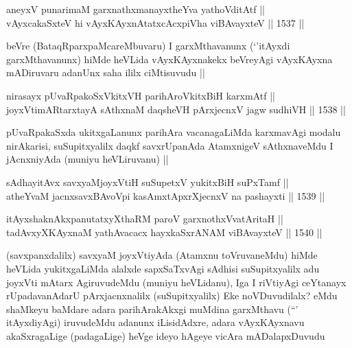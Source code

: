 
\begin{shl}
aneyxV punarimaM garxnathxmanayxtheYva yathoVditAtf ||  \\
vAyxcakaSxteV hi vAyxKAyxnAtatxcAcxpiVha viBAvayxteV ||  1537 ||  
\end{shl}

\begin{artha}
beVre (BataqRparxpaMcareMbuvaru) I garxMthavanunx (`\stext'itAyxdi garxMthavanunx) hiMde heVLida vAyxKAyxnakekx beVreyAgi vAyxKAyxna mADiruvaru adanUnx saha ililx ciMtisuvudu ||
\end{artha}


\begin{shl}
nirasayx pUvaRpakoSxVkitxVH parihAroVkitxBiH karxmAtf || \\
joyxVtimARtarxtayA sAthxnaM daqsheVH pArxjecnxV jagw sudhiVH ||  1538 ||  
\end{shl}

\begin{artha}
pUvaRpakaSxda ukitxgaLanunx parihAra vacanagaLiMda karxmavAgi modalu nirAkarisi, suSupitxyalilx daqkf savxrUpanAda AtamxnigeV sAthxnaveMdu I jAcnxniyAda (muniyu heVLiruvanu) ||
\end{artha}


\begin{shl}
sAdhayitAvx savxyaMjoyxVtiH suSupetxV yukitxBiH suPxTamf || \\
atheYvaM jacnxsavxBAvoV\s pi kasAmxtApxrXjecnxV na pashayxti ||  1539 ||  
\end{shl}
				
\begin{shl}
itAyxshaknAkxpanutatxyXthaRM paroV garxnothxV\s vatAritaH || \\
tadAvxyXKAyxnaM yathAvacacx hayxkaSxrANAM viBAvayxteV ||  1540 ||  
\end{shl}


\begin{artha}
(savxpanxdalilx) savxyaM joyxVtiyAda (Atamxnu toVruvaneMdu) hiMde heVLida yukitxgaLiMda alalxde sapxSaTxvAgi sAdhisi suSupitxyalilx adu joyxVti mAtarx AgiruvudeMdu (muniyu heVLidanu), Iga I riVtiyAgi ceYtanayx rUpadavanAdarU pArxjacnxnalilx (suSupitxyalilx) Eke noVDuvudilalx? eMdu shaMkeyu baMdare adara parihArakAkxgi muMdina garxMthavu (``\stext' itAyxdiyAgi) iruvudeMdu adanunx iLisidAdxre, adara vAyxKAyxnavu akaSxragaLige (padagaLige) heVge ideyo hAgeye vicAra mADalapxDuvudu
\end{artha}

